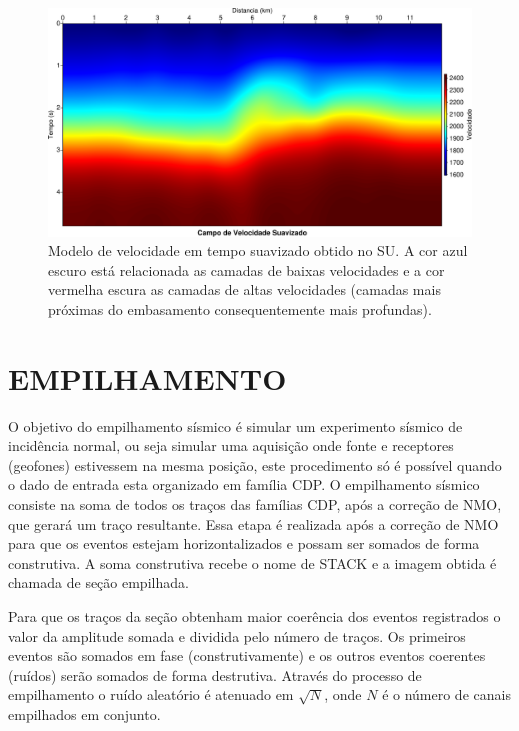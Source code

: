 \begin{landscape}
\begin{figure}[H]
\centering
\includegraphics[totalheight=14cm]{figuras/cap2/campovel_suavizado.pdf}
\caption{Modelo de velocidade em tempo suavizado obtido no SU. A cor azul escuro está relacionada as camadas de baixas velocidades e a cor vermelha escura as camadas de altas velocidades (camadas mais próximas do embasamento consequentemente mais profundas).}
\label{fig:campovel_suavizado}
\end{figure}
\end{landscape}

\section{EMPILHAMENTO}

O objetivo do empilhamento sísmico é simular um experimento sísmico de incidência normal, ou seja simular uma aquisição onde fonte e receptores (geofones) estivessem na mesma posição, este procedimento só é possível quando o dado de entrada esta organizado em família CDP. O empilhamento sísmico consiste na soma de todos os traços das famílias CDP, após a correção de NMO, que gerará um traço resultante. Essa etapa é realizada após a correção de NMO para que os eventos estejam horizontalizados e possam ser somados de forma construtiva. A soma construtiva recebe o nome de STACK e a imagem obtida é
chamada de seção empilhada. \citep{Vasconcellos(2009)}

Para que os traços da seção obtenham maior coerência dos eventos registrados o valor da amplitude somada e dividida pelo número de traços. 
Os primeiros eventos são somados em fase (construtivamente) e os outros eventos coerentes (ruídos) serão somados de forma destrutiva.
Através do processo de empilhamento o ruído aleatório é atenuado em $\sqrt{N}$, onde $N$ é o número de canais empilhados em conjunto.

